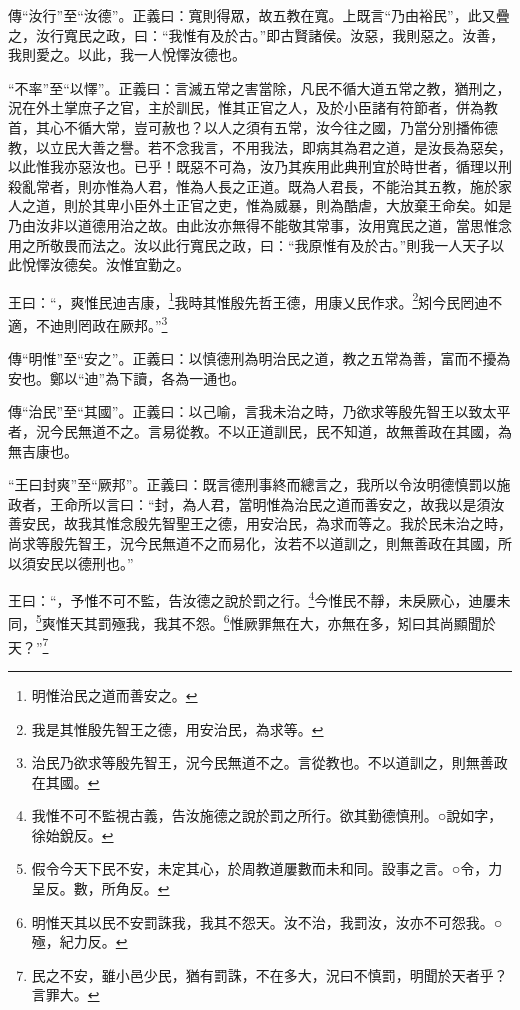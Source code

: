 {\noindent\zhuan{}\fzbyks 傳“汝行”至“汝德”。正義曰：寬則得眾，故五教在寬。上既言“乃由裕民”，此又疊之，汝行寬民之政，曰：“我惟有及於古。”即古賢諸侯。汝惡，我則惡之。汝善，我則愛之。以此，我一人悅懌汝德也。 \par}

{\noindent\shu{}\fzkt “不率”至“以懌”。正義曰：言滅五常之害當除，凡民不循大道五常之教，猶刑之，況在外土掌庶子之官，主於訓民，惟其正官之人，及於小臣諸有符節者，併為教首，其心不循大常，豈可赦也？以人之須有五常，汝今往之國，乃當分別播佈德教，以立民大善之譽。若不念我言，不用我法，即病其為君之道，是汝長為惡矣，以此惟我亦惡汝也。已乎！既惡不可為，汝乃其疾用此典刑宜於時世者，循理以刑殺亂常者，則亦惟為人君，惟為人長之正道。既為人君長，不能治其五教，施於家人之道，則於其卑小臣外土正官之吏，惟為威暴，則為酷虐，大放棄王命矣。如是乃由汝非以道德用治之故。由此汝亦無得不能敬其常事，汝用寬民之道，當思惟念用之所敬畏而法之。汝以此行寬民之政，曰：“我原惟有及於古。”則我一人天子以此悅懌汝德矣。汝惟宜勤之。 \par}

王曰：“，爽惟民迪吉康，\footnote{明惟治民之道而善安之。}我時其惟殷先哲王德，用康乂民作求。\footnote{我是其惟殷先智王之德，用安治民，為求等。}矧今民罔迪不適，不迪則罔政在厥邦。”\footnote{治民乃欲求等殷先智王，況今民無道不之。言從教也。不以道訓之，則無善政在其國。}


{\noindent\zhuan{}\fzbyks 傳“明惟”至“安之”。正義曰：以慎德刑為明治民之道，教之五常為善，富而不擾為安也。鄭以“迪”為下讀，各為一通也。 \par}

{\noindent\zhuan{}\fzbyks 傳“治民”至“其國”。正義曰：以己喻，言我未治之時，乃欲求等殷先智王以致太平者，況今民無道不之。言易從教。不以正道訓民，民不知道，故無善政在其國，為無吉康也。 \par}

{\noindent\shu{}\fzkt “王曰封爽”至“厥邦”。正義曰：既言德刑事終而總言之，我所以令汝明德慎罰以施政者，王命所以言曰：“封，為人君，當明惟為治民之道而善安之，故我以是須汝善安民，故我其惟念殷先智聖王之德，用安治民，為求而等之。我於民未治之時，尚求等殷先智王，況今民無道不之而易化，汝若不以道訓之，則無善政在其國，所以須安民以德刑也。” \par}

王曰：“，予惟不可不監，告汝德之說於罰之行。\footnote{我惟不可不監視古義，告汝施德之說於罰之所行。欲其勤德慎刑。○說如字，徐始銳反。}今惟民不靜，未戾厥心，迪屢未同，\footnote{假令今天下民不安，未定其心，於周教道屢數而未和同。設事之言。○令，力呈反。數，所角反。}爽惟天其罰殛我，我其不怨。\footnote{明惟天其以民不安罰誅我，我其不怨天。汝不治，我罰汝，汝亦不可怨我。○殛，紀力反。}惟厥罪無在大，亦無在多，矧曰其尚顯聞於天？”\footnote{民之不安，雖小邑少民，猶有罰誅，不在多大，況曰不慎罰，明聞於天者乎？言罪大。}


